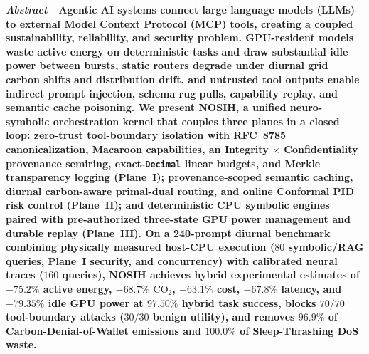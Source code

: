 \documentclass[10pt,twocolumn,letterpaper]{article}
\begin{document}

\noindent\textbf{\textit{Abstract}---Agentic AI systems connect large language models (LLMs) to external Model Context Protocol (MCP) tools, creating a coupled sustainability, reliability, and security problem. GPU-resident models waste active energy on deterministic tasks and draw substantial idle power between bursts, static routers degrade under diurnal grid carbon shifts and distribution drift, and untrusted tool outputs enable indirect prompt injection, schema rug pulls, capability replay, and semantic cache poisoning. We present \textbf{NOSIH}, a unified neuro-symbolic orchestration kernel that couples three planes in a closed loop: zero-trust tool-boundary isolation with RFC~8785 canonicalization, Macaroon capabilities, an Integrity $\times$ Confidentiality provenance semiring, exact-\texttt{Decimal} linear budgets, and Merkle transparency logging (Plane~I); provenance-scoped semantic caching, diurnal carbon-aware primal-dual routing, and online Conformal PID risk control (Plane~II); and deterministic CPU symbolic engines paired with pre-authorized three-state GPU power management and durable replay (Plane~III). On a 240-prompt diurnal benchmark combining physically measured host-CPU execution ($80$ symbolic/RAG queries, Plane~I security, and concurrency) with calibrated neural traces ($160$ queries), NOSIH achieves hybrid experimental estimates of $-75.2\%$ active energy, $-68.7\%$ $\text{CO}_2$, $-63.1\%$ cost, $-67.8\%$ latency, and $-79.35\%$ idle GPU power at $97.50\%$ hybrid task success, blocks $70/70$ tool-boundary attacks ($30/30$ benign utility), and removes $96.9\%$ of Carbon-Denial-of-Wallet emissions and $100.0\%$ of Sleep-Thrashing DoS waste.}
\end{document}
